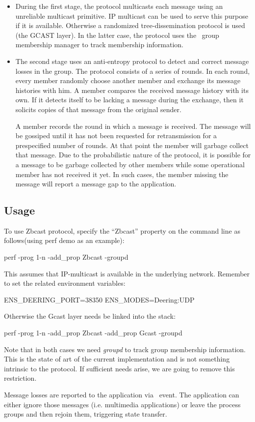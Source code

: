 \begin{itemize}
 \item During the first stage, the protocol multicasts each message
 using an unreliable multicast primitive.  IP multicast can be used to
 serve this purpose if it is available.  Otherwise a randomized
 tree-dissemination protocol is used (the GCAST layer).  In the latter
 case, the protocol uses the \ensemble\ group membership manager to
 track membership information.

 \item The second stage uses an anti-entropy protocol to detect and
 correct message losses in the group.  The protocol consists of a
 series of rounds.  In each round, every member randomly choose
 another member and exchange its message histories with him.  A member
 compares the received message history with its own.  If it detects
 itself to be lacking a message during the exchange, then it solicits
 copies of that message from the original sender.

 A member records the round in which a message is received.  The
 message will be gossiped until it has not been requested for
 retransmission for a prespecified number of rounds.  At that point
 the member will garbage collect that message.  Due to the
 probabilistic nature of the protocol, it is possible for a message to
 be garbage collected by other members while some operational member
 has not received it yet.  In such cases, the member missing the
 message will report a message gap to the application.
 
\end{itemize}


\subsection{Usage}

To use Zbcast protocol, specify the ``Zbcast'' property on the command
line as follows(using perf demo as an example):
\begin{codebox}
  perf -prog 1-n -add_prop Zbcast -groupd
\end{codebox}
This assumes that IP-multicast is available in the underlying
network.  Remember to set the related environment variables:
\begin{codebox}
ENS_DEERING_PORT=38350
ENS_MODES=Deering:UDP
\end{codebox}

Otherwise the Gcast layer needs be linked into the stack:
\begin{codebox}
  perf -prog 1-n -add_prop Zbcast -add_prop Gcast -groupd
\end{codebox}
Note that in both cases we need \emph{groupd} to track group
membership information.  This is the state of art of the current
implementation and is not something intrinsic to the protocol.  If
sufficient needs arise, we are going to remove this restriction.

Message losses are reported to the application via \UpLostMessage\
event.  The application can either ignore those messages
(i.e. multimedia applications) or leave the process groups and then
rejoin them, triggering state transfer.
